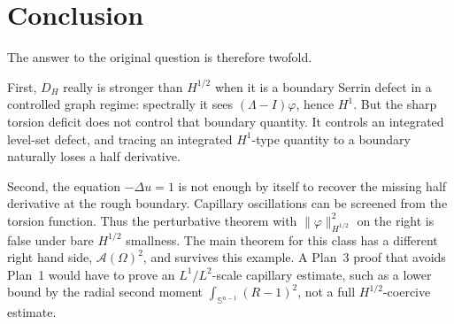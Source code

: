 \documentclass[11pt]{article}
\newcommand{\Om}{\Omega}
\newcommand{\Sph}{\mathbb S^{n-1}}
\begin{document}
\section{Conclusion}

The answer to the original question is therefore twofold.

First, \(D_H\) really is stronger than \(H^{1/2}\) when it is a boundary
Serrin defect in a controlled graph regime: spectrally it sees
\((\Lambda-I)\varphi\), hence \(H^1\).  But the sharp torsion deficit does not
control that boundary quantity.  It controls an integrated level-set defect,
and tracing an integrated \(H^1\)-type quantity to a boundary naturally loses a
half derivative.

Second, the equation \(-\Delta u=1\) is not enough by itself to recover the
missing half derivative at the rough boundary.  Capillary oscillations can be
screened from the torsion function.  Thus the perturbative theorem with
\(\|\varphi\|_{H^{1/2}}^2\) on the right is false under bare \(H^{1/2}\)
smallness.  The main theorem for this class has a different right hand side,
\(\mathcal A(\Om)^2\), and survives this example.  A Plan~3 proof that avoids
Plan~1 would have to prove an \(L^1/L^2\)-scale capillary estimate, such as a
lower bound by the radial second moment \(\int_{\Sph}(R-1)^2\), not a full
\(H^{1/2}\)-coercive estimate.
\end{document}
